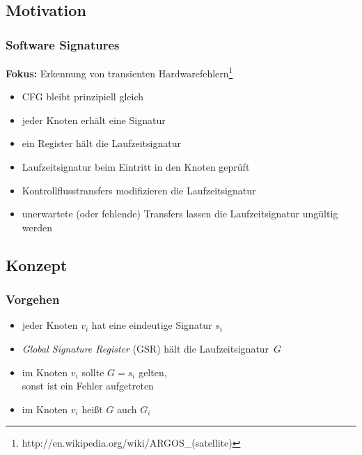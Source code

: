 \documentclass[mathserif,slidestop,compress,red]{beamer}
\begin{document}
\subsection{Motivation}

\begin{frame}
  \frametitle{Software Signatures}
  \textbf{Fokus:} Erkennung von transienten Hardwarefehlern\footnote{http://en.wikipedia.org/wiki/ARGOS\_(satellite)}
  \begin{itemize}
    \pause
    \item CFG bleibt prinzipiell gleich
    \pause
    \item jeder Knoten erhält eine Signatur
    \pause
    \item ein Register hält die Laufzeitsignatur
    \pause
    \item Laufzeitsignatur beim Eintritt in den Knoten geprüft
    \pause
    \item Kontrollflusstransfers modifizieren die Laufzeitsignatur
    \pause
    \item unerwartete (oder fehlende) Transfers lassen die Laufzeitsignatur ungültig werden
  \end{itemize}
\end{frame}

\subsection{Konzept}

\begin{frame}
  \frametitle{Vorgehen}
  \begin{itemize}
    \item jeder Knoten $v_i$ hat eine eindeutige Signatur $s_i$
    \pause
    \item \emph{Global Signature Register} (GSR) hält die Laufzeitsignatur~$G$
    \pause
    \item im Knoten $v_i$ sollte $G = s_i$ gelten, \\
          sonst ist ein Fehler aufgetreten
    \pause
    \item im Knoten $v_i$ heißt $G$ auch $G_i$
  \end{itemize}
\end{frame}
\end{document}
